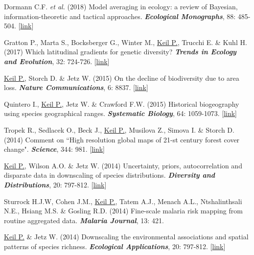 \begin{etaremune}
\item Dormann C.F. \textit{et al.} (2018) Model averaging in ecology: a review of Bayesian, information-theoretic and tactical approaches. \textit{\textbf{Ecological Monographs}}, 88: 485-504. [\href{https://esajournals.onlinelibrary.wiley.com/doi/10.1002/ecm.1309}{link}]

\item Gratton P., Marta S., Bocksberger G., Winter M., \underline{Keil P.}, Trucchi E. \& Kuhl H. (2017) Which latitudinal gradients for genetic diversity? \textit{\textbf{Trends in Ecology and Evolution}}, 32: 724-726. [\href{https://www.sciencedirect.com/science/article/pii/S0169534717301830?via%3Dihub}{link}]

\item \underline{Keil P.}, Storch D. \& Jetz W. (2015) On the decline of biodiversity due to area loss. \textit{\textbf{Nature Communications}}, 6: 8837. [\href{https://www.nature.com/articles/ncomms9837}{link}]

\item Quintero I., \underline{Keil P.}, Jetz W. \& Crawford F.W. (2015) Historical biogeography using species geographical ranges. \textit{\textbf{Systematic Biology}}, 64: 1059-1073. [\href{http://sysbio.oxfordjournals.org/content/64/6/1059.short}{link}] 

\item Tropek R., Sedlacek O., Beck J., \underline{Keil P.}, Musilova Z., Simova I. \& Storch D. (2014) Comment on ``High resolution global maps of 21-st century forest cover change". \textit{\textbf{Science}}, 344: 981. [\href{http://www.sciencemag.org/content/344/6187/981.4.full}{link}] 

\item \underline{Keil P.}, Wilson A.O. \& Jetz W. (2014) Uncertainty, priors, autocorrelation and disparate data in downscaling of species distributions. \textit{\textbf{Diversity and Distributions}}, 20: 797-812. [\href{http://onlinelibrary.wiley.com/doi/10.1111/ddi.12199/abstract}{link}]

\item Sturrock H.J.W, Cohen J.M., \underline{Keil P.}, Tatem A.J., Menach A.L., Ntshalinthsali N.E., Hsiang M.S. \& Gosling R.D. (2014) Fine-scale malaria risk mapping from routine aggregated data. \textit{\textbf{Malaria Journal}}, 13: 421.

\item \underline{Keil P.} \& Jetz W. (2014) Downscaling the environmental associations and spatial patterns of species richness. \textit{\textbf{Ecological Applications}}, 20: 797-812. [\href{http://www.esajournals.org/doi/abs/10.1890/13-0805.1?af=R&}{link}] 


\end{etaremune}
